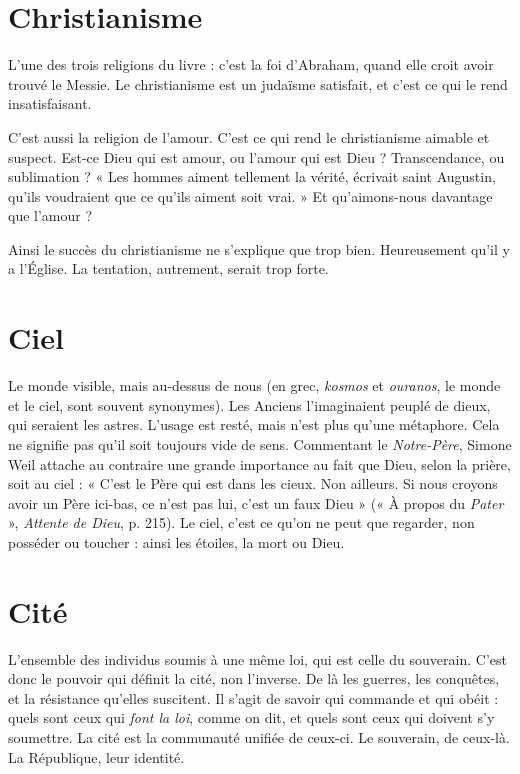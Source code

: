 \section{Christianisme}
L’une des trois religions du livre : c’est la foi d'Abraham,
quand elle croit avoir trouvé le Messie. Le christianisme
est un judaïsme satisfait, et c’est ce qui le rend insatisfaisant.

C’est aussi la religion de l’amour. C’est ce qui rend le christianisme aimable
et suspect. Est-ce Dieu qui est amour, ou l'amour qui est Dieu ? Transcendance,
ou sublimation ? « Les hommes aiment tellement la vérité, écrivait saint
Augustin, qu’ils voudraient que ce qu’ils aiment soit vrai. » Et qu’aimons-nous
davantage que l'amour ?

Ainsi le succès du christianisme ne s’explique que trop bien. Heureusement
qu’il y a l’Église. La tentation, autrement, serait trop forte.

\section{Ciel}
Le monde visible, mais au-dessus de nous (en grec, {\it kosmos} et {\it ouranos},
le monde et le ciel, sont souvent synonymes). Les Anciens l'imaginaient
peuplé de dieux, qui seraient les astres. L’usage est resté, mais n’est plus
qu'une métaphore. Cela ne signifie pas qu’il soit toujours vide de sens. Commentant
le {\it Notre-Père}, Simone Weil attache au contraire une grande importance
au fait que Dieu, selon la prière, soit au ciel : « C’est le Père qui est dans
les cieux. Non ailleurs. Si nous croyons avoir un Père ici-bas, ce n’est pas lui,
c'est un faux Dieu » (« À propos du {\it Pater} », {\it Attente de Dieu}, p. 215). Le ciel,
c’est ce qu’on ne peut que regarder, non posséder ou toucher : ainsi les étoiles,
la mort ou Dieu.

\section{Cité}
L'ensemble des individus soumis à une même loi, qui est celle du
souverain. C’est donc le pouvoir qui définit la cité, non l’inverse. De
là les guerres, les conquêtes, et la résistance qu’elles suscitent. Il s’agit de savoir
qui commande et qui obéit : quels sont ceux qui {\it font la loi}, comme on dit, et
quels sont ceux qui doivent s’y soumettre. La cité est la communauté unifiée de
ceux-ci. Le souverain, de ceux-là. La République, leur identité.

